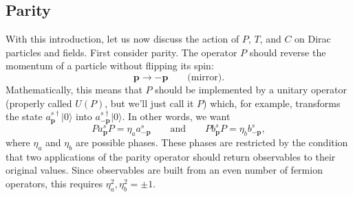 \subsection{Parity}

With this introduction, let us now discuss the action of $P$, $T$, and $C$ on
Dirac particles and fields.  First consider parity.  The operator $P$ should
reverse the momentum of a particle without flipping its spin:
\begin{equation}
  \mathbf{p} \to -\mathbf{p}\qquad \text{(mirror)}.
\end{equation}
Mathematically, this means that $P$ should be implemented by a unitary
operator (properly called $U(P)$, but we'll just call it $P$) which, for
example, transforms the state $a_{\mathbf{p}}^{s\dagger}|0\rangle$ into
$a_{-\mathbf{p}}^{s\dagger}|0\rangle$.  In other words, we want
\begin{equation}
  P a_{\mathbf{p}}^s P = \eta_a a_{-\mathbf{p}}^s
  \qquad\text{and}\qquad
  P b_{\mathbf{p}}^s P = \eta_b b_{-\mathbf{p}}^s,
  \label{eq:3.124}
\end{equation}
where $\eta_a$ and $\eta_b$ are possible phases.  These phases are restricted
by the condition that two applications of the parity operator should return
observables to their original values.  Since observables are built from an
even number of fermion operators, this requires $\eta_a^2, \eta_b^2 = \pm 1$.

